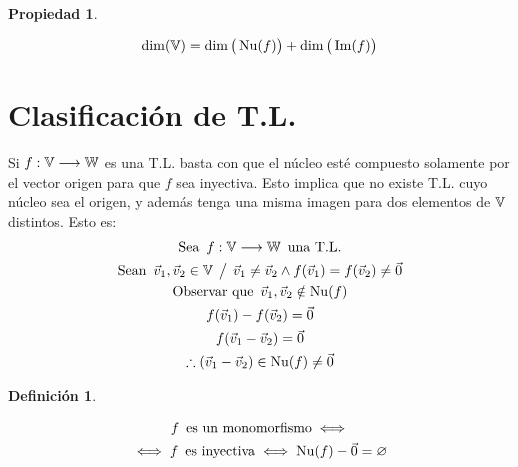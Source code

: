 \documentclass[a5paper,12pt,twoside]{book}
\newtheorem{defn}{{Definición}}[chapter]
\newtheorem{prop}{{Propiedad}}[chapter]
\begin{document}
\begin{mdframed}[style=PropertyFrame]
    \begin{prop}
    \end{prop}
    \begin{equation*}
        \operatorname{dim}(\mathbb{V}) = \operatorname{dim} \big(\operatorname{Nu}(f)\big) + \operatorname{dim} \big(\operatorname{Im}(f)\big)
    \end{equation*}
\end{mdframed}


\section{Clasificación de T.L.}

Si $f: \mathbb{V} \longrightarrow \mathbb{W}$ es una T.L. basta con que el núcleo esté compuesto solamente por el vector origen para que $f$ sea inyectiva.
Esto implica que no existe T.L. cuyo núcleo sea el origen, y además tenga una misma imagen para dos elementos de $\mathbb{V}$ distintos.
Esto es:
\begin{gather*}
    \textrm{Sea} \enspace f: \mathbb{V} \longrightarrow \mathbb{W} \enspace \textrm{una T.L.}
    \\
    \textrm{Sean} \enspace \Vec{v}_1,\Vec{v}_2 \in \mathbb{V} \hspace{1ex} \big/ \hspace{1ex} \Vec{v}_1 \neq \Vec{v}_2 \land f(\Vec{v}_1) = f(\Vec{v}_2) \neq \Vec{0}
    \\
    \textrm{Observar que} \enspace \Vec{v}_1,\Vec{v}_2 \notin \operatorname{Nu}(f)
    \\
    f(\Vec{v}_1) - f(\Vec{v}_2) = \Vec{0}
    \\
    f(\Vec{v}_1 - \Vec{v}_2) = \Vec{0}
    \\
    \therefore \left( \Vec{v}_1 - \Vec{v}_2 \right) \in \operatorname{Nu}(f) \neq \Vec{0}
\end{gather*}


\begin{mdframed}[style=DefinitionFrame]
    \begin{defn}
    \end{defn}
    \begin{multline*}
        f \enspace \textrm{es un monomorfismo} \iff
        \\
        \iff f  \enspace \textrm{es inyectiva}
        \iff \operatorname{Nu}(f) - \Vec{0} = \varnothing
    \end{multline*}
\end{mdframed}
\end{document}
